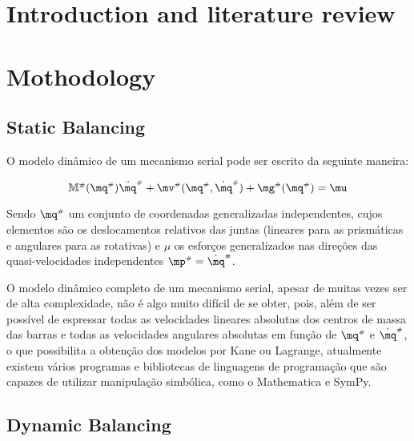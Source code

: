 \documentclass[a4paper,11pt,brazil,fleqn]{article}
\begin{document}




\section{Introduction and literature review}\label{S01}



\section{Mothodology}\label{S02}

\subsection{Static Balancing}\label{S02-1}

O modelo dinâmico de um mecanismo serial pode ser escrito da seguinte maneira:

\begin{equation}
\mM\ssh (\mq\ssh) \ddot{\mq}\ssh + \mv\ssh(\mq\ssh,\dot{\mq}\ssh) + \mg\ssh (\mq\ssh) = \mu
\end{equation}

Sendo $\mq\ssh$ um conjunto de coordenadas generalizadas independentes, cujos elementos s\~{a}o os deslocamentos relativos das juntas (lineares para as prism\'{a}ticas e angulares para as rotativas) e $\mu$ os esfor\c{c}os generalizados nas dire\c{c}\~oes das quasi-velocidades independentes $\mp\ssh = \dot{\mq}\ssh$.

O modelo din\^{a}mico completo de um mecanismo serial, apesar de muitas vezes ser de alta complexidade, n\~{a}o \'{e} algo muito dif\'{i}cil de se obter,  pois, al\'{e}m de ser poss\'{i}vel de espressar todas as velocidades lineares absolutas dos centros de massa das barras e todas as velocidades angulares absolutas em fun\c{c}\~ao de $\mq\ssh$ e  $\dot{\mq}\ssh$, o que possibilita a obten\c{c}\~{a}o dos modelos por Kane ou Lagrange, atualmente existem v\'{a}rios programas e bibliotecas de linguagens de programa\c{c}\~{a}o que s\~{a}o capazes de utilizar manipula\c{c}\~{a}o simb\'{o}lica, como o Mathematica e SymPy.

\subsection{Dynamic Balancing}\label{S02-2}
\end{document}
